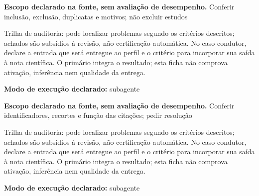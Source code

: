 
\begin{descricao}
\textbf{Escopo declarado na fonte, sem avaliação de desempenho.}
Conferir inclusão, exclusão, duplicatas e motivos; não excluir estudos
\end{descricao}

\begin{funcao}
Trilha de auditoria: pode localizar problemas segundo os critérios descritos; achados são subsídios à revisão, não certificação automática. No caso condutor, declare a entrada que será entregue ao perfil e o critério para incorporar sua saída à nota científica. O primário integra o resultado; esta ficha não comprova ativação, inferência nem qualidade da entrega.
\end{funcao}

\begin{arquitetura}
\textbf{Modo de execução declarado:} subagente
\end{arquitetura}


\begin{descricao}
\textbf{Escopo declarado na fonte, sem avaliação de desempenho.}
Conferir identificadores, recortes e função das citações; pedir resolução
\end{descricao}

\begin{funcao}
Trilha de auditoria: pode localizar problemas segundo os critérios descritos; achados são subsídios à revisão, não certificação automática. No caso condutor, declare a entrada que será entregue ao perfil e o critério para incorporar sua saída à nota científica. O primário integra o resultado; esta ficha não comprova ativação, inferência nem qualidade da entrega.
\end{funcao}

\begin{arquitetura}
\textbf{Modo de execução declarado:} subagente
\end{arquitetura}

